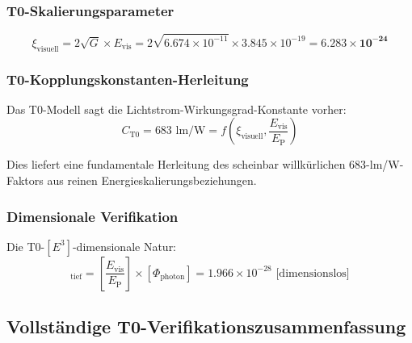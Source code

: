 \documentclass[12pt,a4paper]{article}
\newcommand{\xipar}{\xi}
\newcommand{\EP}{E_{\text{P}}}
\newcommand{\Evis}{E_{\text{vis}}}
\newcommand{\Cto}{C_{\text{T0}}}
\newcommand{\Phiphoton}{\Phi_{\text{photon}}}
\begin{document}
	\subsubsection{T0-Skalierungsparameter}
	\label{subsubsec:candela_skalierungsparameter}
	
	\begin{equation}
		\xipar_{\text{visuell}} = 2\sqrt{G} \times \Evis = 2\sqrt{6.674 \times 10^{-11}} \times 3.845 \times 10^{-19} = \mathbf{6.283 \times 10^{-24}}
		\label{eq:xi_visuell_berechnet}
	\end{equation}
	
	\subsubsection{T0-Kopplungs\-konstanten-Herleitung}
	\label{subsubsec:t0_kopplungsherleitung}
	
	Das T0-Modell sagt die Lichtstrom-Wirkungsgrad-Konstante vorher:
	\begin{equation}
		\Cto = 683 \text{ lm/W} = f\left(\xipar_{\text{visuell}}, \frac{\Evis}{\EP}\right)
		\label{eq:t0_kopplungsvorhersage}
	\end{equation}
	
	Dies liefert eine fundamentale Herleitung des scheinbar willkürlichen 683-lm/W-Faktors aus reinen Energieskalierungsbeziehungen.
	
	\subsubsection{Dimensionale Verifikation}
	\label{subsubsec:candela_dimensionale_verifikation}
	
	Die T0-$[E^3]$-dimensionale Natur:
	\begin{equation}
		[I_{\text{T0}}]_{\text{tief}} = \left[\frac{\Evis}{\EP}\right] \times [\Phiphoton] = 1.966 \times 10^{-28} \text{ [dimensionslos]}
		\label{eq:candela_e3_dimension}
	\end{equation}
	
	\subsection{Vollständige T0-Verifikations\-zusammenfassung}
	\label{subsec:vollstaendige_verifikationszusammenfassung}
	
\end{document}
